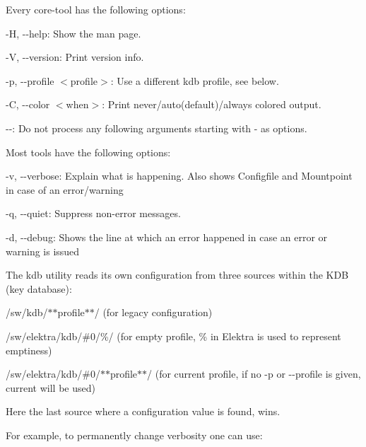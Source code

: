 Every core-\/tool has the following options\+:


\begin{DoxyItemize}
\item {\ttfamily -\/H}, {\ttfamily -\/-\/help}\+: Show the man page.
\item {\ttfamily -\/V}, {\ttfamily -\/-\/version}\+: Print version info.
\item {\ttfamily -\/p}, {\ttfamily -\/-\/profile $<$profile$>$}\+: Use a different kdb profile, see below.
\item {\ttfamily -\/C}, {\ttfamily -\/-\/color $<$when$>$}\+: Print never/auto(default)/always colored output.
\item {\ttfamily -\/-\/}\+: Do not process any following arguments starting with {\ttfamily -\/} as options.
\end{DoxyItemize}

Most tools have the following options\+:


\begin{DoxyItemize}
\item {\ttfamily -\/v}, {\ttfamily -\/-\/verbose}\+: Explain what is happening. Also shows Configfile and Mountpoint in case of an error/warning
\item {\ttfamily -\/q}, {\ttfamily -\/-\/quiet}\+: Suppress non-\/error messages.
\item {\ttfamily -\/d}, {\ttfamily -\/-\/debug}\+: Shows the line at which an error happened in case an error or warning is issued
\end{DoxyItemize}

The {\ttfamily kdb} utility reads its own configuration from three sources within the K\+DB (key database)\+:


\begin{DoxyEnumerate}
\item /sw/kdb/$\ast$$\ast$profile$\ast$$\ast$/ (for legacy configuration)
\item /sw/elektra/kdb/\#0/\%/ (for empty profile, {\ttfamily \%} in Elektra is used to represent emptiness)
\item /sw/elektra/kdb/\#0/$\ast$$\ast$profile$\ast$$\ast$/ (for current profile, if no {\ttfamily -\/p} or {\ttfamily -\/-\/profile} is given, {\ttfamily current} will be used)
\end{DoxyEnumerate}

Here the last source where a configuration value is found, wins.

For example, to permanently change verbosity one can use\+:



